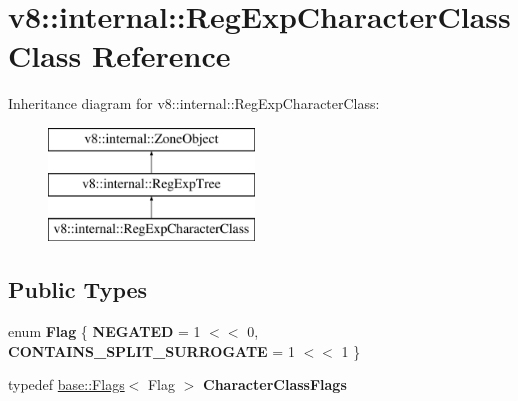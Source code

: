 \hypertarget{classv8_1_1internal_1_1RegExpCharacterClass}{}\section{v8\+:\+:internal\+:\+:Reg\+Exp\+Character\+Class Class Reference}
\label{classv8_1_1internal_1_1RegExpCharacterClass}
Inheritance diagram for v8\+:\+:internal\+:\+:Reg\+Exp\+Character\+Class\+:\begin{figure}[H]
\begin{center}
\leavevmode
\includegraphics[height=3.000000cm]{classv8_1_1internal_1_1RegExpCharacterClass}
\end{center}
\end{figure}
\subsection*{Public Types}
\begin{DoxyCompactItemize}
\item 
\mbox{\label{classv8_1_1internal_1_1RegExpCharacterClass_a077dcd747ae95c38bbe7e89d8bda999a}} 
enum {\bfseries Flag} \{ {\bfseries N\+E\+G\+A\+T\+ED} = 1 $<$$<$ 0, 
{\bfseries C\+O\+N\+T\+A\+I\+N\+S\+\_\+\+S\+P\+L\+I\+T\+\_\+\+S\+U\+R\+R\+O\+G\+A\+TE} = 1 $<$$<$ 1
 \}
\item 
\mbox{\label{classv8_1_1internal_1_1RegExpCharacterClass_a479a60eb9a395a9db21f00e544004b42}} 
typedef \mbox{\hyperlink{classv8_1_1base_1_1Flags}{base\+::\+Flags}}$<$ Flag $>$ {\bfseries Character\+Class\+Flags}
\end{DoxyCompactItemize}
